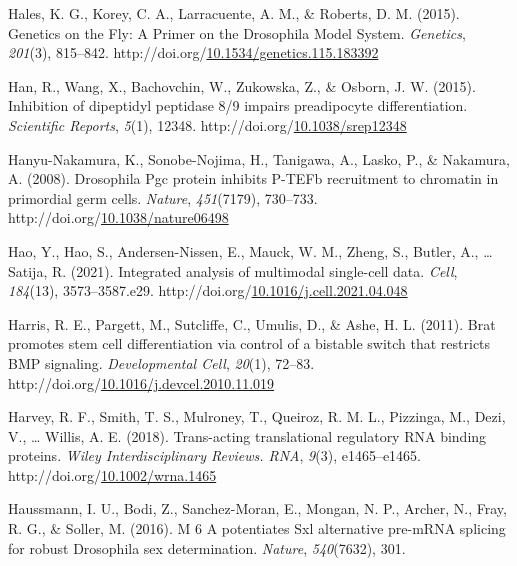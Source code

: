 \documentclass[12pt,oneside]{reedthesis}
\newlength{\cslhangindent}
\newenvironment{CSLReferences}[2] %
 {%
  \setlength{\parindent}{0pt}
  \ifodd #1 \everypar{\setlength{\hangindent}{\cslhangindent}}\ignorespaces\fi
  \ifnum #2 > 0
  \setlength{\parskip}{#2\baselineskip}
  \fi
 }%
 {}
\begin{document}
\begin{CSLReferences}{1}{0}
\leavevmode{}%
Hales, K. G., Korey, C. A., Larracuente, A. M., \& Roberts, D. M. (2015). Genetics on the {Fly}: {A Primer} on the {Drosophila Model System}. \emph{Genetics}, \emph{201}(3), 815--842. http://doi.org/\href{https://doi.org/10.1534/genetics.115.183392}{10.1534/genetics.115.183392}

\leavevmode{}%
Han, R., Wang, X., Bachovchin, W., Zukowska, Z., \& Osborn, J. W. (2015). Inhibition of dipeptidyl peptidase 8/9 impairs preadipocyte differentiation. \emph{Scientific Reports}, \emph{5}(1), 12348. http://doi.org/\href{https://doi.org/10.1038/srep12348}{10.1038/srep12348}

\leavevmode{}%
Hanyu-Nakamura, K., Sonobe-Nojima, H., Tanigawa, A., Lasko, P., \& Nakamura, A. (2008). Drosophila {Pgc} protein inhibits {P-TEFb} recruitment to chromatin in primordial germ cells. \emph{Nature}, \emph{451}(7179), 730--733. http://doi.org/\href{https://doi.org/10.1038/nature06498}{10.1038/nature06498}

\leavevmode{}%
Hao, Y., Hao, S., Andersen-Nissen, E., Mauck, W. M., Zheng, S., Butler, A., \ldots{} Satija, R. (2021). Integrated analysis of multimodal single-cell data. \emph{Cell}, \emph{184}(13), 3573--3587.e29. http://doi.org/\href{https://doi.org/10.1016/j.cell.2021.04.048}{10.1016/j.cell.2021.04.048}

\leavevmode{}%
Harris, R. E., Pargett, M., Sutcliffe, C., Umulis, D., \& Ashe, H. L. (2011). Brat promotes stem cell differentiation via control of a bistable switch that restricts {BMP} signaling. \emph{Developmental Cell}, \emph{20}(1), 72--83. http://doi.org/\href{https://doi.org/10.1016/j.devcel.2010.11.019}{10.1016/j.devcel.2010.11.019}

\leavevmode{}%
Harvey, R. F., Smith, T. S., Mulroney, T., Queiroz, R. M. L., Pizzinga, M., Dezi, V., \ldots{} Willis, A. E. (2018). Trans-acting translational regulatory {RNA} binding proteins. \emph{Wiley Interdisciplinary Reviews. RNA}, \emph{9}(3), e1465--e1465. http://doi.org/\href{https://doi.org/10.1002/wrna.1465}{10.1002/wrna.1465}

\leavevmode{}%
Haussmann, I. U., Bodi, Z., Sanchez-Moran, E., Mongan, N. P., Archer, N., Fray, R. G., \& Soller, M. (2016). M 6 {A} potentiates {Sxl} alternative pre-{mRNA} splicing for robust {Drosophila} sex determination. \emph{Nature}, \emph{540}(7632), 301.


\end{CSLReferences}
\end{document}
